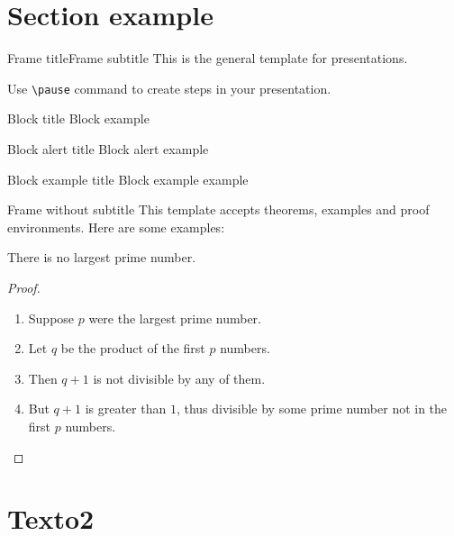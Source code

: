 \begin{frame}{}
	\tableofcontents
\end{frame}

\section{Section example}
\begin{frame}{Frame title}{Frame subtitle}
	This is the general template for presentations.
	
	\pause
	Use \texttt{\textbackslash pause} command to create steps in your presentation.
	
	\pause
	\begin{block}{Block title}
		Block example
	\end{block}

	\pause
	\begin{alertblock}{Block alert title}
		Block alert example
	\end{alertblock}

	\pause
	\begin{exampleblock}{Block example title}
		Block example example
	\end{exampleblock}
\end{frame}

\begin{frame}{Frame without subtitle}
	This template accepts theorems, examples and proof environments. Here are some examples:
	\begin{theorem}
		There is no largest prime number.
	\end{theorem}
	\begin{proof}
		\begin{enumerate}
			\item<1-> Suppose $p$ were the largest prime number.
			\item<2-> Let $q$ be the product of the first $p$ numbers.
			\item<3-> Then $q + 1$ is not divisible by any of them.
			\item<4-> But $q + 1$ is greater than $1$, thus divisible by some 
			prime number not in the first $p$ numbers.\qedhere
		\end{enumerate}
	\end{proof}
\end{frame}

\section{Texto2}


